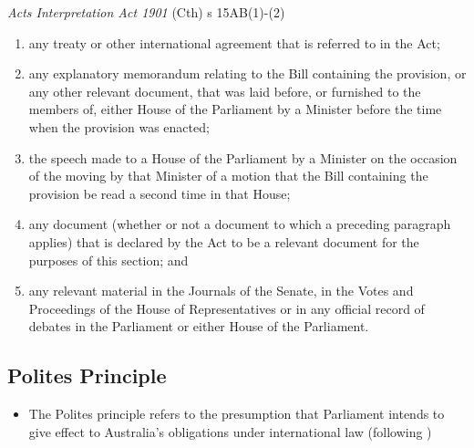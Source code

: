 \begin{statutedetails}{\textit{Acts Interpretation Act 1901} (Cth) s 15AB(1)-(2)}
\begin{enumerate}[label=(\arabic*)]
\begin{enumerate}[label=(\alph*)]
            \item any treaty or other international agreement that is referred to in the Act;
            \item any explanatory memorandum relating to the Bill containing the provision, or any other relevant document, that was laid before, or furnished to the members of, either House of the Parliament by a Minister before the time when the provision was enacted;
            \item the speech made to a House of the Parliament by a Minister on the occasion of the moving by that Minister of a motion that the Bill containing the provision be read a second time in that House;
            \item any document (whether or not a document to which a preceding paragraph applies) that is declared by the Act to be a relevant document for the purposes of this section; and
            \item any relevant material in the Journals of the Senate, in the Votes and Proceedings of the House of Representatives or in any official record of debates in the Parliament or either House of the Parliament.
        \end{enumerate}
    \end{enumerate}
\end{statutedetails}

\subsection{Polites Principle}
\begin{itemize}
    \item The Polites principle refers to the presumption that Parliament intends to give effect to Australia's obligations under international law (following )
\end{itemize}

